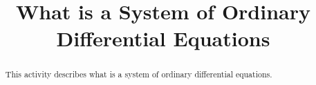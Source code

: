 \documentclass{ximera}
\title{What is a System of Ordinary Differential Equations}
\begin{document}
\begin{abstract}
This activity describes what is a system of ordinary differential equations.
\end{abstract}

\maketitle
\end{document}
